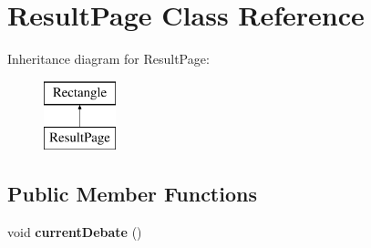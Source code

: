 \hypertarget{classResultPage}{\section{Result\-Page Class Reference}
\label{classResultPage}
}
Inheritance diagram for Result\-Page\-:\begin{figure}[H]
\begin{center}
\leavevmode
\includegraphics[height=2.000000cm]{classResultPage}
\end{center}
\end{figure}
\subsection*{Public Member Functions}
\begin{DoxyCompactItemize}
\item 
\hypertarget{classResultPage_af72c9a587fbec369997dd8a48ae22394}{void {\bfseries current\-Debate} ()}\label{classResultPage_af72c9a587fbec369997dd8a48ae22394}

\end{DoxyCompactItemize}
